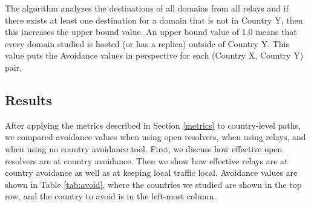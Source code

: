The algorithm analyzes the destinations of all domains from all relays and if there exists at least one destination for a domain that is not in Country Y, then this increases the upper bound value.  An upper bound value of 1.0 means that every domain studied is hosted (or has a replica) outside of Country Y.  This value puts the Avoidance values in perspective for each (Country X, Country Y) pair. 

\subsection{Results}
After applying the metrics described in Section \ref{metrics} to country-level paths, we compared avoidance values when using open resolvers, when using relays, and when using no country avoidance tool.  First, we discuss how effective open resolvers are at country avoidance.  Then we show how effective relays are at country avoidance as well as at keeping local traffic local.  Avoidance values are shown in Table \ref{tab:avoid}, where the countries we studied are shown in the top row, and the country to avoid is in the left-most column.  

